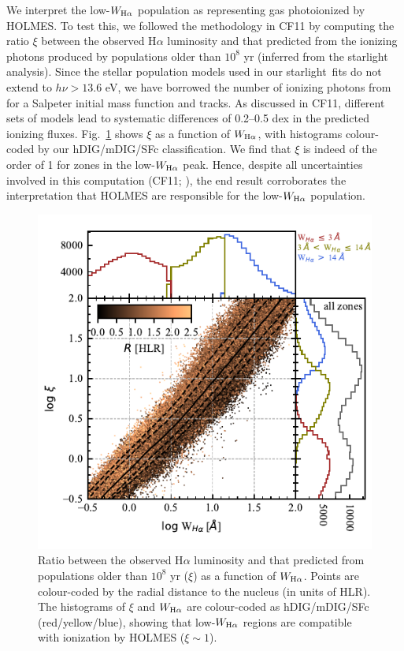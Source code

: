 \documentclass[a4paper, fleqn, usenatbib, useAMS]{mnras}
\newcommand{\Ha}{\ifmmode {\rm H}\alpha \else H$\alpha$\fi\xspace}
\newcommand\starlight{{\sc starlight}}          		%
\begin{document}
We interpret the low-$W_{\Ha}$ population as representing gas photoionized by HOLMES. To test this, we followed the methodology in CF11 by computing the ratio $\xi$ between the observed \Ha luminosity and that predicted from the ionizing photons produced by populations older than $10^8$ yr (inferred from the {\sc starlight} analysis). Since the stellar population models used in our \starlight\ fits \citep{GonzalezDelgado2005,Vazdekis2010} do not extend to $h\nu > 13.6$ eV, we have borrowed the number of ionizing photons from \citet{Bruzual.Charlot.2003} for a Salpeter initial mass function and \cite{Girardi2000} tracks. As discussed in CF11, different sets of models lead to systematic differences of 0.2--0.5 dex in the predicted ionizing fluxes. Fig.~\ref{fig:WHa-Xi} shows $\xi$ as a function of  $W_{\Ha}$, with histograms colour-coded by our hDIG/mDIG/SFc classification. We find that $\xi$ is indeed of the order of 1 for zones in the low-$W_{\Ha}$ peak. Hence, despite all uncertainties involved in this computation (CF11; \citealt{Belfiore.etal.2016, Morisset.etal.2016}), the end result corroborates the interpretation that HOLMES are responsible for the low-$W_{\Ha}$ population.

\begin{figure}
 \includegraphics{figs/fig_logxi_logWHa_histograms.pdf}
 \caption{ Ratio  between the observed \Ha luminosity and that predicted from populations older than $10^8$ yr ($\xi$) as a function of  $W_{\Ha}$. Points are colour-coded by the radial distance to the nucleus (in units of HLR). The histograms of $\xi$ and $W_{\Ha}$  are colour-coded as hDIG/mDIG/SFc (red/yellow/blue), showing that low-$W_{\Ha}$ regions are compatible with ionization by HOLMES ($\xi \sim 1$). }
 \label{fig:WHa-Xi}
\end{figure}
\end{document}
